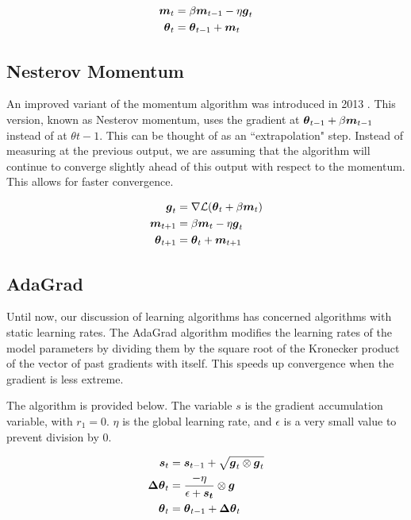 \documentclass{article}
\begin{document}
\begin{align*}
    \vb*{m}_t &= \beta \vb*{m}_{t-1} - \eta \vb*{g}_t \\
    \vb*{\theta}_t &= \vb*{\theta}_{t-1} + \vb*{m}_t
\end{align*}

\subsection{Nesterov Momentum}

An improved variant of the momentum algorithm was introduced in 2013 \cite{sutskever13}. This version, known as Nesterov momentum, uses the gradient at \(\vb*{\theta}_{t-1} + \beta \vb*{m}_{t-1}\) instead of at \(\theta{t-1}\). This can be thought of as an ``extrapolation" step. Instead of measuring at the previous output, we are assuming that the algorithm will continue to converge slightly ahead of this output with respect to the momentum. This allows for faster convergence.

\begin{align*}
    \vb*{g}_{t} &= \nabla \mathcal{L} (\vb*{\theta}_{t} + \beta \vb*{m}_{t}) \\
    \vb*{m}_{t+1} &= \beta \vb*{m}_{t} - \eta \vb*{g}_t \\
    \vb*{\theta}_{t+1} &= \vb*{\theta}_t + \vb*{m}_{t+1}
\end{align*}


\subsection{AdaGrad} %

Until now, our discussion of learning algorithms has concerned algorithms with static learning rates. The AdaGrad algorithm modifies the learning rates of the model parameters by dividing them by the square root of the Kronecker product of the vector of past gradients with itself. This speeds up convergence when the gradient is less extreme. 

The algorithm is provided below. The variable \(s\) is the gradient accumulation variable, with \(r_1 = 0\). \(\eta\) is the global learning rate, and \(\epsilon\) is a very small value to prevent division by \(0\).

\begin{align*}
    \vb*{s}_t &= \vb*{s}_{t-1} + \sqrt{\vb*{g}_t \otimes \vb*{g}_t} \\
    \vb*{\Delta \theta}_t &= \frac{-\eta}{\epsilon + \vb*{s_t}} \otimes \vb*{g} \\
    \vb*{\theta}_t &= \vb*{\theta}_{t-1} + \vb*{\Delta \theta}_t
\end{align*}
\end{document}
